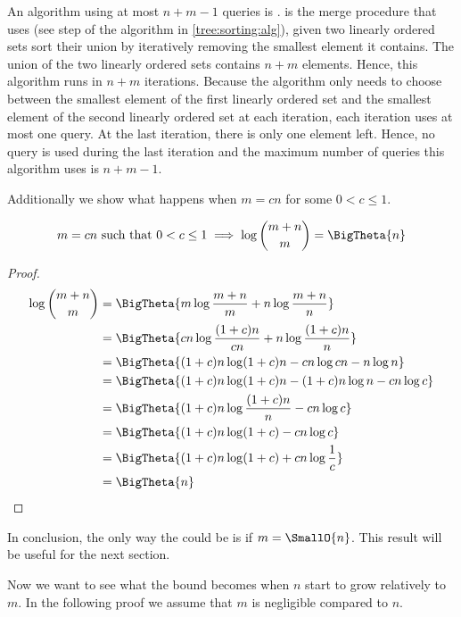 An algorithm using at most \(n+m-1\) queries is \tapemerge. \tapemerge is the
merge procedure that \mergesort uses (see step  of the \mergesort
algorithm in \ref{tree:sorting:alg}), \ie given two linearly ordered sets sort
their union by iteratively removing the smallest element it contains. The union
of the two linearly ordered sets contains \(n+m\) elements. Hence, this
algorithm runs in \(n+m\) iterations. Because the algorithm only needs to
choose between the smallest element of the first linearly ordered set and the
smallest element of the second linearly ordered set at each iteration, each
iteration uses at most one query. At the last iteration, there is only one
element left. Hence, no query is used during the last iteration and the maximum
number of queries this algorithm uses is \(n+m-1\).

Additionally we show what happens when \(m = c n\) for some \(0 < c \le 1\).

\begin{lemma}
\begin{align*}
m = c n \text{ such that } 0 < c \le 1 &\implies \log\binom{m+n}{m} = \BigTheta{n}\\
\end{align*}
\end{lemma}

\begin{proof}
\begin{align*}
\log\binom{m+n}{m} &= \BigTheta{m \log\frac{m+n}{m} + n \log\frac{m+n}{n}}\\
&= \BigTheta{cn \log\frac{(1+c)n}{cn} + n \log\frac{(1+c)n}{n}}\\
&= \BigTheta{(1+c)n \log (1+c)n - cn \log cn - n \log n}\\
&= \BigTheta{(1+c)n \log (1+c)n - (1+c)n \log n - cn \log c}\\
&= \BigTheta{(1+c)n \log \frac{(1+c)n}{n} - cn \log c}\\
&= \BigTheta{(1+c)n \log (1+c) - cn \log c}\\
&= \BigTheta{(1+c)n \log (1+c) + cn \log \frac{1}{c}}\\
&= \BigTheta{n}\\
\end{align*}
\end{proof}

In conclusion, the only way the  could be  is if \(m =
\SmallO{n}\). This result will be useful for the next section.

Now we want to see what the bound becomes when $n$ start to grow relatively to
$m$. In the following proof we assume that $m$ is negligible compared to $n$.

